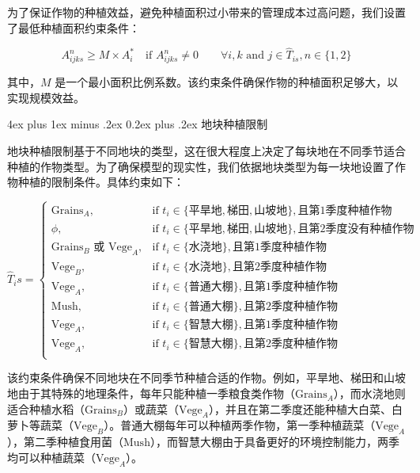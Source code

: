 \documentclass[12pt,a4paper]{nmmcm}
\makeatletter
\renewcommand\subsubsection{\@startsection{subsubsection}{3}{1em}%
  {4ex plus 1ex minus .2ex}%
  {0.2ex plus .2ex}%
  {\normalfont\large\bfseries}}
\makeatother
\begin{document}
为了保证作物的种植效益，避免种植面积过小带来的管理成本过高问题，我们设置了最低种植面积约束条件：

\[
  A_{ijks}^{n} \geq M \times A_i^* \quad \text{if } A_{ijks}^{n} \neq 0 \qquad \forall i,k \text{ and } j \in \hat{T}_{is},n \in \{1,2\}
\]

其中，$M$ 是一个最小面积比例系数。该约束条件确保作物的种植面积足够大，以实现规模效益。

\subsubsection{地块种植限制}

地块种植限制基于不同地块的类型，这在很大程度上决定了每块地在不同季节适合种植的作物类型。为了确保模型的现实性，我们依据地块类型为每一块地设置了作物种植的限制条件。具体约束如下：

\[
\hat{T}_is =
\begin{cases}
\text{Grains}_A, & \text{if } t_i \in \{\text{平旱地}, \text{梯田}, \text{山坡地}\}, \text{且第} 1 \text{季度种植作物} \\
\phi, & \text{if } t_i \in \{\text{平旱地}, \text{梯田}, \text{山坡地}\}, \text{且第} 2 \text{季度没有种植作物} \\
\text{Grains}_B \text{ 或 } \text{Vege}_A, & \text{if } t_i \in \{\text{水浇地}\}, \text{且第} 1 \text{季度种植作物} \\
\text{Vege}_B, & \text{if } t_i \in \{\text{水浇地}\}, \text{且第} 2 \text{季度种植作物} \\
\text{Vege}_A, & \text{if } t_i \in \{\text{普通大棚}\}, \text{且第} 1 \text{季度种植作物} \\
\text{Mush}, & \text{if } t_i \in \{\text{普通大棚}\}, \text{且第} 2 \text{季度种植作物} \\
\text{Vege}_A, & \text{if } t_i \in \{\text{智慧大棚}\}, \text{且第} 1 \text{季度种植作物} \\
\text{Vege}_A, & \text{if } t_i \in \{\text{智慧大棚}\}, \text{且第} 2 \text{季度种植作物} \\
\end{cases}
\]

该约束条件确保不同地块在不同季节种植合适的作物。例如，平旱地、梯田和山坡地由于其特殊的地理条件，每年只能种植一季粮食类作物（$\text{Grains}_A$），而水浇地则适合种植水稻（$\text{Grains}_B$）或蔬菜（$\text{Vege}_A$），并且在第二季度还能种植大白菜、白萝卜等蔬菜（$\text{Vege}_B$）。普通大棚每年可以种植两季作物，第一季种植蔬菜（$\text{Vege}_A$），第二季种植食用菌（$\text{Mush}$），而智慧大棚由于具备更好的环境控制能力，两季均可以种植蔬菜（$\text{Vege}_A$）。
\end{document}
